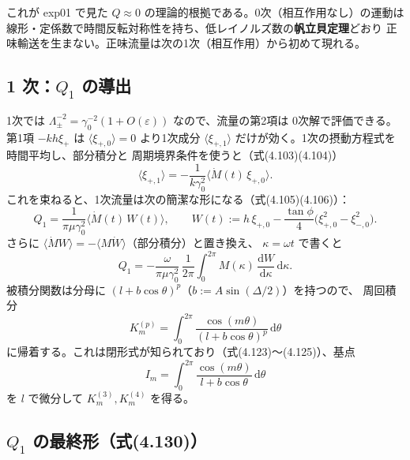 \documentclass[11pt,a4paper]{article}
\newcommand{\gamz}{\gamma_{0}}
\newcommand{\dd}{\mathrm{d}}
\begin{document}
\begin{keybox}
これが exp01 で見た $Q\approx0$ の理論的根拠である。0次（相互作用なし）の運動は
線形・定係数で時間反転対称性を持ち、低レイノルズ数の\textbf{帆立貝定理}どおり
正味輸送を生まない。正味流量は次の1次（相互作用）から初めて現れる。
\end{keybox}

\subsection{1 次：$Q_1$ の導出}

1次では $\Lambda_\pm^{-2}=\gamz^{-2}(1+O(\varepsilon))$ なので、流量の第2項は
0次解で評価できる。第1項 $-kh\xi_+$ は $\langle\xi_{+,0}\rangle=0$ より1次成分
$\langle\xi_{+,1}\rangle$ だけが効く。1次の摂動方程式を時間平均し、部分積分と
周期境界条件を使うと（式(4.103)(4.104)）
\begin{equation}
\langle\xi_{+,1}\rangle=-\frac{1}{k\gamz^2}\langle\dot M(t)\,\xi_{+,0}\rangle.
\end{equation}
これを束ねると、1次流量は次の簡潔な形になる（式(4.105)(4.106)）：
\begin{equation}
Q_1=\frac{1}{\pi\mu\gamz^2}\big\langle\dot M(t)\,W(t)\big\rangle,\qquad
W(t):=h\,\xi_{+,0}-\frac{\tan\phi}{4}\big(\xi_{+,0}^2-\xi_{-,0}^2\big).
\end{equation}
さらに $\langle\dot M W\rangle=-\langle M\dot W\rangle$（部分積分）と置き換え、
$\kappa=\omega t$ で書くと
\begin{equation}
Q_1=-\frac{\omega}{\pi\mu\gamz^2}\,\frac{1}{2\pi}\int_0^{2\pi}M(\kappa)\,
\frac{\dd W}{\dd\kappa}\,\dd\kappa.
\end{equation}
被積分関数は分母に $(l+b\cos\theta)^p$（$b:=A\sin(\Delta/2)$）を持つので、
周回積分
\begin{equation}
K_m^{(p)}=\int_0^{2\pi}\frac{\cos(m\theta)}{(l+b\cos\theta)^p}\,\dd\theta
\end{equation}
に帰着する。これは閉形式が知られており（式(4.123)〜(4.125)）、基点
\begin{equation}
I_m=\int_0^{2\pi}\frac{\cos(m\theta)}{l+b\cos\theta}\,\dd\theta
\end{equation}
を $l$ で微分して $K_m^{(3)},K_m^{(4)}$ を得る。

\subsection{$Q_1$ の最終形（式(4.130)）}
\end{document}

